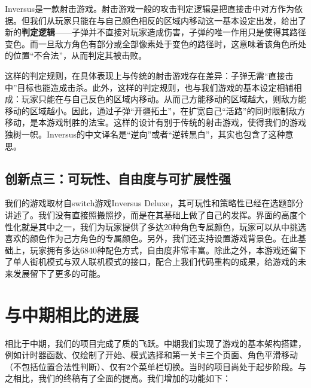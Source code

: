 \documentclass[lang=cn,11pt,a4paper]{elegantpaper}
\begin{document}
Inversus是一款射击游戏。射击游戏一般的攻击判定逻辑是把直接击中对方作为依据。但我们从玩家只能在与自己颜色相反的区域内移动这一基本设定出发，给出了新的\textbf{判定逻辑}——子弹并不直接对玩家造成伤害，子弹的唯一作用只是使得其路径变色。而一旦敌方角色有部分或全部像素处于变色的路径时，这意味着该角色所处的位置“不合法”，从而判定其被击败。

这样的判定规则，在具体表现上与传统的射击游戏存在差异：子弹无需“直接击中”目标也能造成击杀。此外，这样的判定规则，也与我们游戏的基本设定相辅相成：玩家只能在与自己反色的区域内移动。从而己方能移动的区域越大，则敌方能移动的区域越小。因此，通过子弹“开疆拓土”，在扩宽自己“活路”的同时限制敌方移动，是本游戏制胜的法宝。这样的设计有别于传统的射击游戏，使得我们的游戏独树一帜。Inversus的中文译名是“逆向”或者“逆转黑白”，其实也包含了这种意思。

\subsection{创新点三：可玩性、自由度与可扩展性强}

我们的游戏取材自switch游戏Inversus Deluxe，其可玩性和策略性已经在选题部分讲述了。我们没有直接照搬照抄，而是在其基础上做了自己的发挥。界面的高度个性化就是其中之一，我们为玩家提供了多达20种角色专属颜色，玩家可以从中挑选喜欢的颜色作为己方角色的专属颜色。另外，我们还支持设置游戏背景色。在此基础上，玩家拥有多达6840种配色方式，自由度非常丰富。除此之外，本游戏还留下了单人街机模式与双人联机模式的接口，配合上我们代码重构的成果，给游戏的未来发展留下了更多的可能。

\section{与中期相比的进展}

相比于中期，我们的项目完成了质的飞跃。中期我们实现了游戏的基本架构搭建，例如计时器函数、仅绘制了开始、模式选择和第一关卡三个页面、角色平滑移动（不包括位置合法性判断）、仅有2个菜单栏切换。当时的项目尚处于起步阶段。与之相比，我们的终稿有了全面的提高。我们增加的功能如下：
\end{document}
